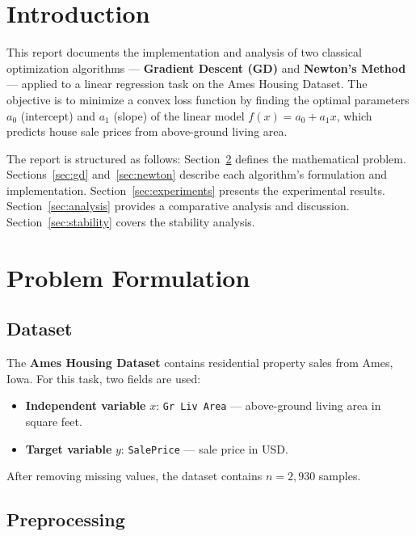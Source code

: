 \documentclass[12pt,a4paper]{article}
\begin{document}
\section{Introduction}

This report documents the implementation and analysis of two classical optimization
algorithms — \textbf{Gradient Descent (GD)} and \textbf{Newton's Method} — applied to
a linear regression task on the Ames Housing Dataset. The objective is to minimize a
convex loss function by finding the optimal parameters \(a_0\) (intercept) and \(a_1\)
(slope) of the linear model \(f(x) = a_0 + a_1 x\), which predicts house sale prices
from above-ground living area.

The report is structured as follows: Section~\ref{sec:problem} defines the
mathematical problem. Sections~\ref{sec:gd} and~\ref{sec:newton} describe each
algorithm's formulation and implementation. Section~\ref{sec:experiments} presents the
experimental results. Section~\ref{sec:analysis} provides a comparative analysis and
discussion. Section~\ref{sec:stability} covers the stability analysis.

\section{Problem Formulation}
\label{sec:problem}

\subsection{Dataset}

The \textbf{Ames Housing Dataset} contains residential property sales from Ames, Iowa.
For this task, two fields are used:

\begin{itemize}[noitemsep]
    \item \textbf{Independent variable} \(x\): \texttt{Gr Liv Area} — above-ground
    living area in square feet.
    \item \textbf{Target variable} \(y\): \texttt{SalePrice} — sale price in USD.
\end{itemize}

After removing missing values, the dataset contains \(n = 2{,}930\) samples.

\subsection{Preprocessing}
\end{document}
